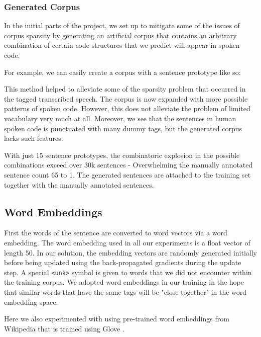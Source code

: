 \documentclass[fyp]{socreport}
\begin{document}

\subsubsection{Generated Corpus}
In the initial parts of the project, we set up to mitigate some of the issues
of corpus sparsity by generating an artificial corpus that contains an arbitrary
combination of certain code structures that we predict will appear in spoken code.

For example, we can easily create a corpus with a sentence prototype like so:

\hspace{20pt}
   

This method helped to alleviate some of the sparsity problem that occurred in
the tagged transcribed speech. The corpus is now expanded with more possible
patterns of spoken code. However, this does not alleviate the problem of limited
vocabulary very much at all. Moreover, we see that the sentences in human spoken
code is punctuated with many dummy tags, but the generated corpus lacks such
features.

With just 15 sentence prototypes, the combinatoric explosion in the possible
combinations exceed over 30k sentences - Overwhelming the manually annotated
sentence count 65 to 1. The generated sentences are attached to the training
set together with the manually annotated sentences.

\subsection{Word Embeddings}
First the words of the sentence are converted to word vectors via a word
embedding. The word embedding used in all our experiments is a float vector of
length 50. In our solution, the embedding vectors are randomly generated
initially before being updated using the back-propagated gradients during the
update step. A special \texttt{<unk>} symbol is given to words that we did not
encounter within the training corpus. We adopted word embeddings in our
training in the hope that similar words that have the same tags will be "close
together" in the word embedding space.

Here we also experimented with using pre-trained word embeddings from Wikipedia
that is trained using Glove \cite{pennington2014glove}.
\end{document}
